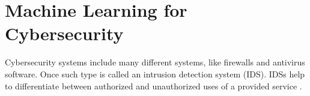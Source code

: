 \section{Machine Learning for Cybersecurity}
Cybersecurity systems include many different systems, like firewalls and antivirus software.
Once such type is called an intrusion detection system (IDS).
IDSs help to differentiate between authorized and unauthorized uses of a provided service \cite{xin2018}.
